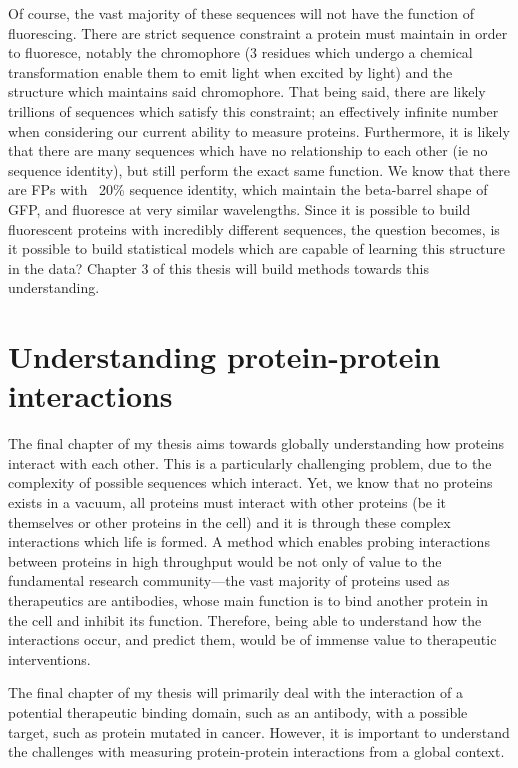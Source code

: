 Of course, the vast majority of these sequences will not have the function of fluorescing. There are strict sequence constraint a protein must maintain in order to fluoresce, notably the chromophore (3 residues which undergo a chemical transformation enable them to emit light when excited by light) and the structure which maintains said chromophore. That being said, there are likely trillions of sequences which satisfy this constraint; an effectively infinite number  when considering our current ability to measure proteins. Furthermore, it is likely that there are many sequences which have no relationship to each other (ie no sequence identity), but still perform the exact same function. We know that there are FPs with ~20\% sequence identity, which maintain the beta-barrel shape of GFP, and fluoresce at very similar wavelengths\cite{Dedecker2013-jb}. Since it is possible to build fluorescent proteins with incredibly different sequences, the question becomes, is it possible to build statistical models which are capable of learning this structure in the data? Chapter 3 of this thesis will build methods towards this understanding. 

\section{Understanding protein-protein interactions}

The final chapter of my thesis aims towards globally understanding how proteins interact with each other. This is a particularly challenging problem, due to the complexity of possible sequences which interact. Yet, we know that no proteins exists in a vacuum, all proteins must interact with other proteins (be it themselves or other proteins in the cell) and it is through these complex interactions which life is formed.  A method which enables probing interactions between proteins in high throughput would be not only of value to the fundamental research community---the vast majority of proteins used as therapeutics are antibodies\cite{Nelson2010-aj}, whose main function is to bind another protein in the cell and inhibit its function. Therefore, being able to understand how the interactions occur, and predict them, would be of immense value to therapeutic interventions. 

The final chapter of my thesis will primarily deal with the interaction of a potential therapeutic binding domain, such as an antibody, with a possible target, such as protein mutated in cancer. However, it is important to understand the challenges with measuring protein-protein interactions from a global context. 

